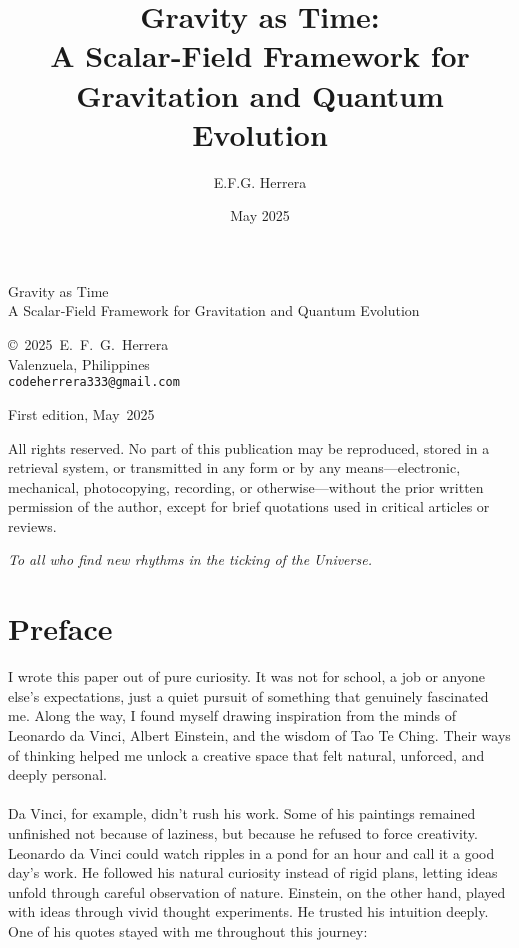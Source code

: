 \documentclass[12pt,oneside]{book}
\title{Gravity as Time: \\
{A Scalar-Field Framework for Gravitation and Quantum Evolution}}
\author{E.F.G. Herrera}
\date{May 2025}
\newenvironment{dedication}{\clearpage\thispagestyle{empty}\vspace*{4cm}\begin{flushright}\itshape}{\end{flushright}\vfill\clearpage}
\begin{document}
\frontmatter

\begin{titlepage}
  \centering
  {\LARGE Gravity as Time\\[0.5em] \Large A Scalar‑Field Framework for Gravitation and Quantum Evolution\par}
  \vspace{3cm}
  {\large © 2025 E. F. G. Herrera\\Valenzuela, Philippines\\\texttt{codeherrera333@gmail.com}\par}
  \vfill
  First edition, May 2025
\end{titlepage}

\thispagestyle{empty}
\noindent
All rights reserved. No part of this publication may be reproduced, stored in a retrieval system, or transmitted in any form or by any means—electronic, mechanical, photocopying, recording, or otherwise—without the prior written permission of the author, except for brief quotations used in critical articles or reviews.
\vfill
\clearpage

\begin{dedication}
To all who find new rhythms in the ticking of the Universe.
\end{dedication}

\chapter*{Preface}
I wrote this paper out of pure curiosity. It was not for school, a job or anyone else's expectations, just a quiet pursuit of something that genuinely fascinated me. Along the way, I found myself drawing inspiration from the minds of Leonardo da Vinci, Albert Einstein, and the wisdom of Tao Te Ching. Their ways of thinking helped me unlock a creative space that felt natural, unforced, and deeply personal. \\
\\
Da Vinci, for example, didn’t rush his work. Some of his paintings remained unfinished not because of laziness, but because he refused to force creativity. Leonardo da Vinci could watch ripples in a pond for an hour and call it a good day’s work. He followed his natural curiosity instead of rigid plans, letting ideas unfold through careful observation of nature. Einstein, on the other hand, played with ideas through vivid thought experiments. He trusted his intuition deeply. One of his quotes stayed with me throughout this journey:\\
\end{document}
